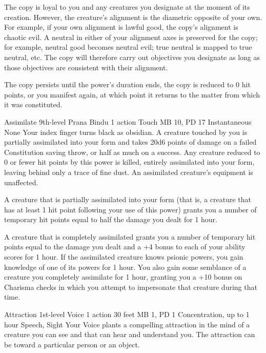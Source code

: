 The copy is loyal to you and any creatures you designate at the
moment of its creation. However, the creature's alignment is the
diametric opposite of your own. For example, if your own alignment
is lawful good, the copy's alignment is chaotic evil. A neutral in
either of your alignment axes is preserved for the copy;
for example, neutral good becomes neutral evil; true neutral is mapped
to true neutral, etc.
The copy will therefore carry out objectives you designate
as long as those objectives are consistent with their alignment.

The copy persists until the power's duration ends, the copy
is reduced to 0 hit points, or you manifest  again,
at which point it returns to the matter from which it was constituted.

\DndPowerHeader%
    {Assimilate\label{pwr:assimilate}}
    {9th-level Prana Bindu}
    {1 action}
    {Touch}
    {MB 10, PD 17}
    {Instantaneous}
    {None}
Your index finger turns black as obsidian.
A creature touched by you is partially assimilated into your form
and takes 20d6 points of damage on a failed Constitution saving throw,
or half as much on a success.
Any creature reduced to 0 or fewer hit points by this power is killed,
entirely assimilated into your form,
leaving behind only a trace of fine dust.
An assimilated creature's equipment is unaffected.

A creature that is partially assimilated into your form
(that is, a creature that has at least 1 hit point
following your use of this power)
grants you a number of temporary hit points equal to
half the damage you dealt for 1 hour.

A creature that is completely assimilated grants you
a number of temporary hit points equal to
the damage you dealt and a
+4 bonus to each of your ability scores for 1 hour.
If the assimilated creature knows psionic powers,
you gain knowledge of one of its powers for 1 hour.
You also gain some semblance of a creature you completely assimilate
for 1 hour, granting you a +10 bonus on Charisma checks in which you
attempt to impersonate that creature during that time.

\DndPowerHeader%
    {Attraction\label{pwr:attraction}}
    {1st-level Voice}
    {1 action}
    {30 feet}
    {MB 1, PD 1}
    {Concentration, up to 1 hour}
    {Speech, Sight}
Your Voice plants a compelling attraction
in the mind of a creature you can see and that can hear
and understand you.
The attraction can be toward a particular person or an object.

